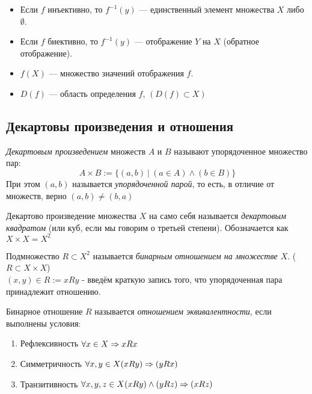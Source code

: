 \begin{itemize}
    \item Если $f$ инъективно, то $f^{-1}(y)$ --- единственный
        элемент множества $X$ либо $\emptyset$.
    \item Если $f$ биективно, то  $f^{-1}(y)$ --- отображение $Y$ на 
        $X$ (обратное отображение).
    \item $f(X)$ --- множество значений отображения $f$.
    \item $D(f)$ --- область определения $f$, $\left(D(f) \subset X\right)$ 
\end{itemize}

\subsection{Декартовы произведения и отношения}

\begin{definition}
    \textit{Декартовым произведением} множеств $A$ и $B$ называют упорядоченное множество пар:
    \[
        A \times B := \{(a, b)\ |\ (a \in A) \wedge (b \in B)\}
    \]
    При этом $(a, b)$ называется \textit{упорядоченной парой}, то есть, в отличие от множеств, верно $(a, b) \neq (b, a)$
\end{definition}

\begin{definition}
    Декартово произведение множества $X$ на само себя называется \textit{декартовым квадратом} (или куб, если мы говорим о третьей степени). Обозначается как $X \times X = X^2$
\end{definition}

\begin{definition}
    Подмножество $R \subset X^2$ называется \textit{бинарным отношением на множестве $X$}.
    ($R \subset X \times X$) \\    
    
    $(x, y) \in R := xRy$ - введём краткую запись того, что упорядоченная пара принадлежит отношению.
\end{definition}

\begin{definition}
    Бинарное отношение $R$ называется \textit{отношением эквивалентности}, если выполнены условия:
    \begin{enumerate}
        \item Рефлексивность $\forall x \in X \Rightarrow xRx$
        \item Симметричность $\forall x, y \in X (xRy) \Rightarrow (yRx)$
        \item Транзитивность $\forall x, y, z \in X (xRy) \wedge (yRz) \Rightarrow (xRz)$
    \end{enumerate}
\end{definition}

